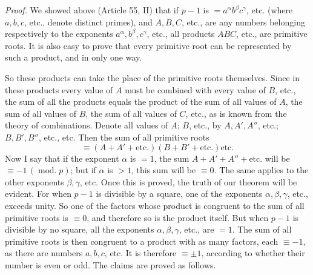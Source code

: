 \emph{Proof.} We showed above (Article 55, II) that if $p-1$ is $=a^{\alpha}b^{\beta}c^{\gamma}$, etc. (where $a,b,c$, etc., denote distinct primes), and $A,B,C$, etc., are any numbers belonging respectively to the exponents $a^{\alpha},b^{\beta},c^{\gamma}$, etc., all products $ABC$, etc., are primitive roots. It is also easy to prove that every primitive root can be represented by such a product, and in only one way.

So these products can take the place of the primitive roots themselves. Since in these products every value of $A$ must be combined with every value of $B$, etc., the sum of all the products equals the product of the sum of all values of $A$, the sum of all values of $B$, the sum of all values of $C$, etc., as is known from the theory of combinations. Denote all values of $A$; $B$, etc., by $A,A',A''$, etc.; $B,B',B''$, etc., etc. Then the sum of all primitive roots
\[\equiv(A+A'+\text{etc.})(B+B'+\text{etc.})\text{etc.}\]
Now I say that if the exponent $\alpha$ is $=1$, the sum $A+A'+A''+\text{etc.}$ will be $\equiv-1\,(\operatorname{mod.}p)$; but if $\alpha$ is $>1$, this sum will be $\equiv0$. The same applies to the other exponents $\beta,\gamma$, etc. Once this is proved, the truth of our theorem will
be evident. For when $p-1$ is divisible by a square, one of the exponents $\alpha,\beta,\gamma$, etc., exceeds unity. So one of the factors whose product is congruent to the sum of all primitive roots is $\equiv0$, and therefore so is the product itself. But when $p-1$ is divisible by no square, all the exponents $\alpha,\beta,\gamma$, etc., are $=1$. The sum of all primitive roots is then congruent to a product with as many factors, each $\equiv-1$, as there are numbers $a,b,c$, etc. It is therefore $\equiv\pm1$, according to whether their number is even or odd. The claims are proved as follows.

